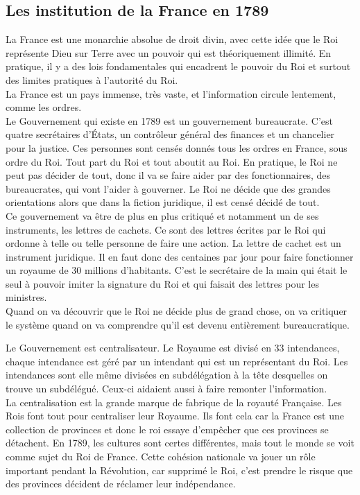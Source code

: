 \documentclass[10pt, a4paper, openany]{book}
\begin{document}
\subsection{Les institution de la France en 1789}

La France est une monarchie absolue de droit divin, avec cette idée que le Roi représente Dieu sur Terre avec un pouvoir qui est théoriquement illimité. En pratique, il y a des lois fondamentales qui encadrent le pouvoir du Roi et surtout des limites pratiques à l'autorité du Roi. \\
La France est un pays immense, très vaste, et l'information circule lentement, comme les ordres. \\
Le Gouvernement qui existe en 1789 est un gouvernement bureaucrate. C'est quatre secrétaires d'États, un contrôleur général des finances et un chancelier pour la justice. Ces personnes sont censés donnés tous les ordres en France, sous ordre du Roi. Tout part du Roi et tout aboutit au Roi. En pratique, le Roi ne peut pas décider de tout, donc il va se faire aider par des fonctionnaires, des bureaucrates, qui vont l'aider à gouverner. Le Roi ne décide que des grandes orientations alors que dans la fiction juridique, il est censé décidé de tout. \\
Ce gouvernement va être de plus en plus critiqué et notamment un de ses instruments, les lettres de cachets. Ce sont des lettres écrites par le Roi qui ordonne à telle ou telle personne de faire une action. La lettre de cachet est un instrument juridique. Il en faut donc des centaines par jour pour faire fonctionner un royaume de 30 millions d'habitants. C'est le secrétaire de la main qui était le seul à pouvoir imiter la signature du Roi et qui faisait des lettres pour les ministres. \\
Quand on va découvrir que le Roi ne décide plus de grand chose, on va critiquer le système quand on va comprendre qu'il est devenu entièrement bureaucratique. 


Le Gouvernement est centralisateur. Le Royaume est divisé en 33 intendances, chaque intendance est géré par un intendant qui est un représentant du Roi. Les intendances sont elle même divisées en subdélégation à la tête desquelles on trouve un subdélégué. Ceux-ci aidaient aussi à faire remonter l'information. \\
La centralisation est la grande marque de fabrique de la royauté Française. Les Rois font tout pour centraliser leur Royaume. Ils font cela car la France est une collection de provinces et donc le roi essaye d'empêcher que ces provinces se détachent. En 1789, les cultures sont certes différentes, mais tout le monde se voit comme sujet du Roi de France. Cette cohésion nationale va jouer un rôle important pendant la Révolution, car supprimé le Roi, c'est prendre le risque que des provinces décident de réclamer leur indépendance.
\end{document}
